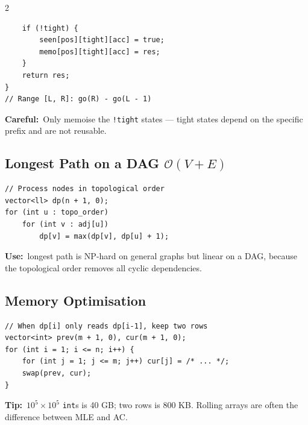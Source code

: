 \documentclass[10pt]{article}
\newcommand{\code}[1]{\texttt{\small #1}}
\newcommand{\sub}[2]{\subsection[#1]{#1\hspace{0.6em}%
  \textnormal{\color{accent2}\small$\mathcal{O}(#2)$}}}
\newcommand{\uses}[1]{{\color{accent2}\footnotesize\textbf{Use:}}~{\footnotesize #1}\par}
\newcommand{\tip}[1]{{\color{tipc}\footnotesize\textbf{Tip:}}~{\footnotesize #1}\par}
\newcommand{\warn}[1]{{\color{warnc}\footnotesize\textbf{Careful:}}~{\footnotesize #1}\par}
\begin{document}
\begin{multicols}{2}
\begin{lstlisting}
    if (!tight) {
        seen[pos][tight][acc] = true;
        memo[pos][tight][acc] = res;
    }
    return res;
}
// Range [L, R]: go(R) - go(L - 1)
\end{lstlisting}
\warn{Only memoise the \code{!tight} states --- tight states depend on
the specific prefix and are not reusable.}

\sub{Longest Path on a DAG}{V + E}
\begin{lstlisting}
// Process nodes in topological order
vector<ll> dp(n + 1, 0);
for (int u : topo_order)
    for (int v : adj[u])
        dp[v] = max(dp[v], dp[u] + 1);
\end{lstlisting}
\uses{longest path is NP-hard on general graphs but linear on a DAG,
because the topological order removes all cyclic dependencies.}

\subsection{Memory Optimisation}
\begin{lstlisting}
// When dp[i] only reads dp[i-1], keep two rows
vector<int> prev(m + 1, 0), cur(m + 1, 0);
for (int i = 1; i <= n; i++) {
    for (int j = 1; j <= m; j++) cur[j] = /* ... */;
    swap(prev, cur);
}
\end{lstlisting}
\tip{$10^5 \times 10^5$ \code{int}s is 40 GB; two rows is 800 KB.
Rolling arrays are often the difference between MLE and AC.}

\end{multicols}

\end{document}
